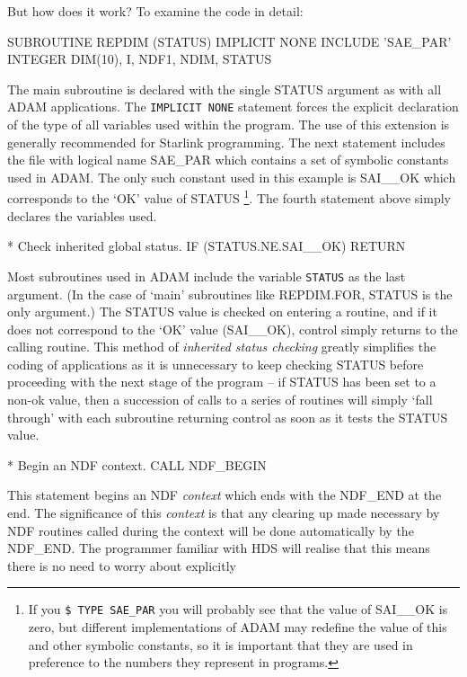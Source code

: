 \documentclass[twoside,11pt,nolof]{starlink}
\begin{document}
But how does it work?
To examine the code in detail:
\begin{terminalv}
      SUBROUTINE REPDIM (STATUS)
      IMPLICIT NONE
      INCLUDE 'SAE_PAR'
      INTEGER DIM(10), I, NDF1, NDIM, STATUS
\end{terminalv}
The  main subroutine is declared with the single STATUS argument
as with all ADAM applications.
The \texttt{IMPLICIT NONE} statement forces the explicit declaration of the
type of all variables used within the program. The use of this extension
is generally recommended for Starlink programming.
The next statement includes the file with logical name SAE\_PAR which
contains a set of symbolic constants used in ADAM.
The only such constant used in this example is SAI\_\_OK
which corresponds to  the `OK' value of STATUS
\footnote{If you  \texttt{\$ TYPE SAE\_PAR} you will probably
see that the value of  SAI\_\_OK  is zero, but different implementations
of ADAM may redefine the value of this and other symbolic  constants,
so it is important
that they are used in preference to the numbers they represent in programs.}.
The fourth statement above simply declares the variables used.
\begin{terminalv}
*   Check inherited global status.
      IF (STATUS.NE.SAI__OK) RETURN
\end{terminalv}
Most subroutines used in ADAM include the variable \texttt{STATUS} as the last
argument. (In the case of `main' subroutines like REPDIM.FOR, STATUS is the
only argument.)
The STATUS value is checked on entering a routine, and if it does not
correspond to the `OK' value (SAI\_\_OK),  control simply
returns to the calling routine.
This method of {\sl inherited status checking\/}  greatly simplifies the
coding of applications as it is unnecessary to keep checking STATUS
before proceeding with the next stage of the program --
if STATUS has been set to a non-ok value, then  a
succession of calls to a series of routines will simply `fall through'
with each subroutine returning control as soon as it tests the STATUS
value.
\begin{terminalv}
*   Begin an NDF context.
      CALL NDF_BEGIN
\end{terminalv}
This statement begins an NDF {\sl context\/} which ends with the
NDF\_END at the end.
The significance of this {\sl context\/} is that any
clearing up made necessary by NDF routines called
during the context will be done automatically by the NDF\_END.
The programmer familiar with HDS will realise that this means
there is no need to worry about explicitly
\end{document}
